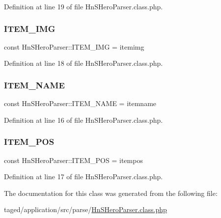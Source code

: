 Definition at line 19 of file Hn\+S\+Hero\+Parser.\+class.\+php.

\mbox{\label{class_hn_s_hero_parser_ac82fee41e18b6b12f5c14e1ee054bd3f}} 
\subsubsection{\texorpdfstring{I\+T\+E\+M\+\_\+\+I\+MG}{ITEM\_IMG}}
{\footnotesize\ttfamily const Hn\+S\+Hero\+Parser\+::\+I\+T\+E\+M\+\_\+\+I\+MG = \textquotesingle{}itemimg\textquotesingle{}}



Definition at line 18 of file Hn\+S\+Hero\+Parser.\+class.\+php.

\mbox{\label{class_hn_s_hero_parser_a7e8f1a62dc0b4c66d3021b04b0407893}} 
\subsubsection{\texorpdfstring{I\+T\+E\+M\+\_\+\+N\+A\+ME}{ITEM\_NAME}}
{\footnotesize\ttfamily const Hn\+S\+Hero\+Parser\+::\+I\+T\+E\+M\+\_\+\+N\+A\+ME = \textquotesingle{}itemname\textquotesingle{}}



Definition at line 16 of file Hn\+S\+Hero\+Parser.\+class.\+php.

\mbox{\label{class_hn_s_hero_parser_aec4e7d8783aeedcbe16baebb37e8ad3a}} 
\subsubsection{\texorpdfstring{I\+T\+E\+M\+\_\+\+P\+OS}{ITEM\_POS}}
{\footnotesize\ttfamily const Hn\+S\+Hero\+Parser\+::\+I\+T\+E\+M\+\_\+\+P\+OS = \textquotesingle{}itempos\textquotesingle{}}



Definition at line 17 of file Hn\+S\+Hero\+Parser.\+class.\+php.



The documentation for this class was generated from the following file\+:\begin{DoxyCompactItemize}
\item 
taged/application/src/parse/\hyperlink{_hn_s_hero_parser_8class_8php}{Hn\+S\+Hero\+Parser.\+class.\+php}\end{DoxyCompactItemize}
